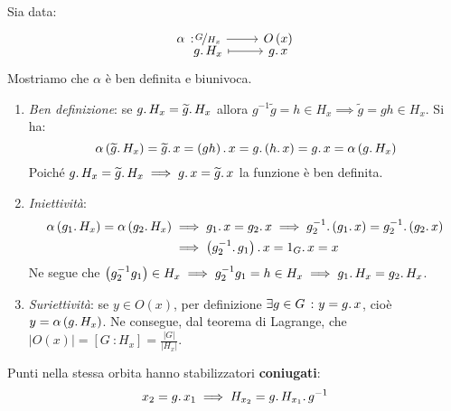 \begin{demonstration}
Sia data:
\begin{equation*}
	\funztot{\alpha}{\nicefrac{G}{H_x}}{O\left(x\right)}{g\ldotp H_x}{g\ldotp x}
\end{equation*}
Mostriamo che $\alpha$ è ben definita e biunivoca.
\begin{enumerate}
	\item \textit{Ben definizione}: se $g\ldotp H_x=\widetilde{g}\ldotp H_x$ allora $g^{-1}\widetilde{g}=h\in H_x\implies\widetilde{g}=gh\in H_x$. Si ha:
	\begin{equation*}
		\alpha\left(\widetilde{g}\ldotp H_x\right)=\widetilde{g}\ldotp x = \left(gh\right)\ldotp x = g \ldotp\left( h\ldotp x\right)=g\ldotp x=\alpha\left(g\ldotp H_x\right)
	\end{equation*}
 Poiché $g\ldotp H_x=\widetilde{g}\ldotp H_x\implies g\ldotp x=\widetilde{g}\ldotp x$ la funzione è ben definita.
 \item \textit{Iniettività}:
 \begin{align*}
 	\alpha\left(g_1\ldotp H_x\right)=\alpha\left(g_2\ldotp H_x\right)&\implies g_1\ldotp x=g_2\ldotp x\implies g_2^{-1}\ldotp\left(g_1\ldotp x\right)=g_2^{-1}\ldotp\left(g_2\ldotp x\right)\\
 	&\implies \left(g_2^{-1}\ldotp g_1\right)\ldotp x=1_G\ldotp x=x
 \end{align*}
Ne segue che $\left(g_2^{-1} g_1\right)\in H_x\implies g_2^{-1} g_1=h\in H_x\implies g_1\ldotp H_x=g_2\ldotp H_x$.
\item \textit{Suriettività}: se $y\in O\left(x\right)$, per definizione $\exists g\in G\ \colon y=g\ldotp x$, cioè $y=\alpha\left(g\ldotp H_x\right)$.
Ne consegue, dal teorema di Lagrange, che $\lvert O\left(x\right)\rvert = \left[G\ \colon H_x\right]= \frac{\lvert G\rvert}{\lvert H_x\rvert}$.
\end{enumerate}
\end{demonstration}
\begin{observe}
Punti nella stessa orbita hanno stabilizzatori \textbf{coniugati}:
\begin{equation}
x_2=g\ldotp x_1\implies H_{x_2}=g\ldotp H_{x_1}\ldotp g^{-1}
\end{equation}
\end{observe}
